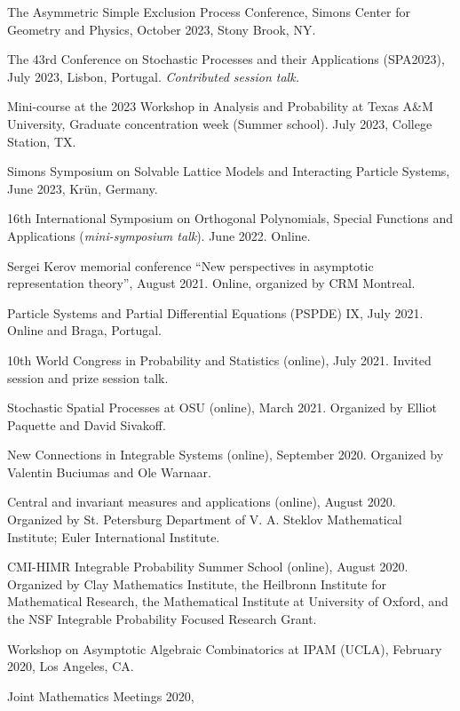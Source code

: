 \documentclass[letterpaper,11pt]{article}
\begin{document}
\begin{etaremune}
	\item
	The Asymmetric Simple Exclusion Process Conference, Simons Center for Geometry and Physics, October 2023, Stony Brook, NY.

	\item
	The 43rd Conference on Stochastic Processes and their Applications (SPA2023), July 2023, Lisbon, Portugal.
	\emph{Contributed session talk.}

	\item
	Mini-course at the
	2023 Workshop in Analysis and Probability at Texas A\&M University, Graduate concentration week (Summer school). July 2023, College Station, TX.

	\item
	Simons Symposium on Solvable Lattice Models and Interacting Particle Systems, June 2023, Kr\"un, Germany.
	\item
	16th International Symposium on Orthogonal Polynomials, Special Functions and Applications (\emph{mini-symposium talk}).
	June 2022. Online.
\item
	Sergei Kerov memorial conference
	``New perspectives in asymptotic representation theory'',
	August 2021. Online, organized by CRM Montreal.
\item
	Particle Systems and Partial Differential Equations (PSPDE) IX,
	July 2021. Online and Braga, Portugal.
\item
	10th World Congress in Probability and Statistics (online),
	July 2021.
	Invited session and prize session talk.
\item
	Stochastic Spatial Processes at OSU (online),
	March 2021.
	Organized by Elliot Paquette and David Sivakoff.
\item New Connections in Integrable Systems (online),
	September 2020.
	Organized by Valentin Buciumas and Ole Warnaar.
\item
	Central and invariant measures and applications (online),
	August 2020.
	Organized by St. Petersburg Department of V. A. Steklov Mathematical Institute; Euler International Institute.
\item
	CMI-HIMR Integrable Probability Summer School (online),
	August 2020.
	Organized by
	Clay Mathematics Institute, the Heilbronn Institute for Mathematical Research,
	the Mathematical Institute at University of Oxford,
	and the NSF Integrable Probability Focused Research Grant.
\item
	Workshop on Asymptotic Algebraic Combinatorics at
	IPAM (UCLA), February 2020,
	Los Angeles, CA.
\item Joint Mathematics Meetings 2020,

\end{etaremune}
\end{document}
